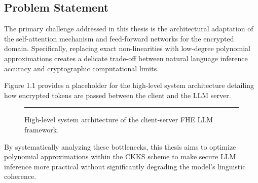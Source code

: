 \subsection{Problem Statement}
The primary challenge addressed in this thesis is the architectural adaptation of the self-attention mechanism and feed-forward networks for the encrypted domain. Specifically, replacing exact non-linearities with low-degree polynomial approximations creates a delicate trade-off between natural language inference accuracy and cryptographic computational limits. 

Figure 1.1 provides a placeholder for the high-level system architecture detailing how encrypted tokens are passed between the client and the LLM server.

\begin{figure}[h]
\centering
\rule{10cm}{5cm} %
\caption{High-level system architecture of the client-server FHE LLM framework.}
\end{figure}

By systematically analyzing these bottlenecks, this thesis aims to optimize polynomial approximations within the CKKS scheme to make secure LLM inference more practical without significantly degrading the model's linguistic coherence.